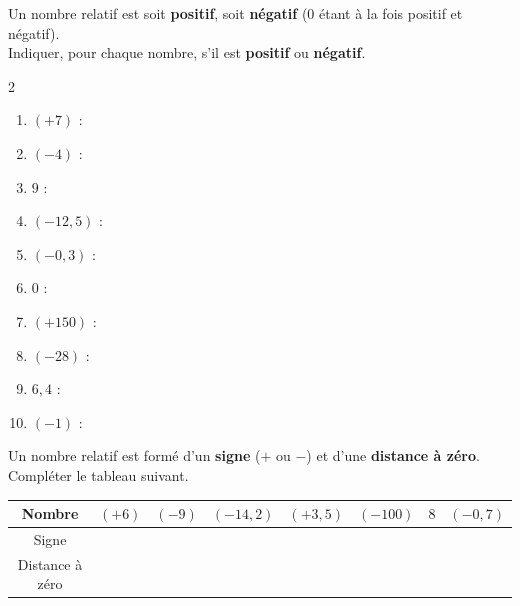 \documentclass[11pt]{article}
\begin{document}

\begin{exercicedevoir}[5]
Un nombre relatif est soit \textbf{positif}, soit \textbf{négatif} (0 étant à la fois positif
et négatif).\\
Indiquer, pour chaque nombre, s'il est \textbf{positif} ou \textbf{négatif}.
\smallskip

\begin{multicols}{2}
\begin{enumerate}[itemsep=0.6em]
\item $(+7)$ : \dotfill
\item $(-4)$ : \dotfill
\item $9$ : \dotfill
\item $(-12,5)$ : \dotfill
\item $(-0,3)$ : \dotfill
\item $0$ : \dotfill
\item $(+150)$ : \dotfill
\item $(-28)$ : \dotfill
\item $6,4$ : \dotfill
\item $(-1)$ : \dotfill
\end{enumerate}
\end{multicols}
\end{exercicedevoir}

\begin{exercicedevoir}[7]
Un nombre relatif est formé d'un \textbf{signe} ($+$ ou $-$) et d'une \textbf{distance à
zéro}.\\
Compléter le tableau suivant.
\smallskip

\begin{center}
\renewcommand{\arraystretch}{1.8}
\begin{tabular}{|c|c|c|c|c|c|c|c|}
\hline
Nombre & $(+6)$ & $(-9)$ & $(-14,2)$ & $(+3,5)$ & $(-100)$ & $8$ & $(-0,7)$ \\
\hline
Signe & & & & & & & \\
\hline
Distance à zéro & & & & & & & \\
\hline
\end{tabular}
\end{center}
\end{exercicedevoir}
\end{document}
